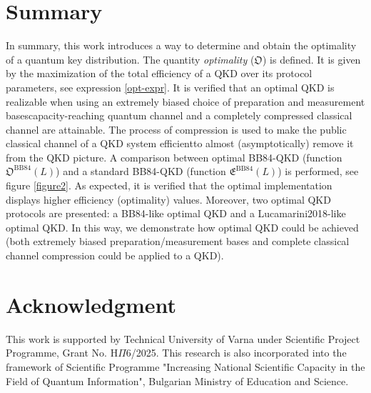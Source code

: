 \documentclass[journal,onecolumn]{IEEEtran}
\theoremstyle{thmstyleone}%
\theoremstyle{thmstyletwo}%
\theoremstyle{thmstylethree}%
\begin{document}
	\section{Summary}\label{summary}
	In summary, this work introduces a way to determine and obtain the optimality of a quantum key distribution. The quantity \textit{optimality} ($\mathfrak{O}$) is defined. It is given by the maximization of the total efficiency of a QKD over its protocol parameters, see expression \eqref{opt-expr}. It is verified that an optimal QKD is realizable when using an extremely biased choice of preparation and measurement bases\textemdash capacity-reaching quantum channel and a completely compressed classical channel are attainable. The process of compression is used to make the public classical channel of a QKD system efficient\textemdash to almost (asymptotically) remove it from the QKD picture.
	A comparison between optimal BB84-QKD (function $\mathfrak{O}^{\text{BB84}}(L)$) and a standard BB84-QKD (function $\mathfrak{E}^{\text{BB84}}(L)$) is performed, see figure \ref{figure2}. As expected, it is verified that the optimal implementation displays higher efficiency (optimality) values.
	Moreover, two optimal QKD protocols are presented: a BB84-like optimal QKD and a Lucamarini2018-like optimal QKD. In this way, we demonstrate how optimal QKD  could be achieved (both extremely biased preparation/measurement bases \cite{Lo2005} and complete classical channel compression could be applied to a QKD).
	
	\section*{Acknowledgment}
	This work is supported by Technical University of Varna under Scientific Project Programme, Grant No. $\text{H}\Pi$6/2025. This research is also incorporated into the framework of Scientific Programme "Increasing National Scientific Capacity in the Field of Quantum Information", Bulgarian Ministry of Education and Science.
	
	
	
	
	
\end{document}
